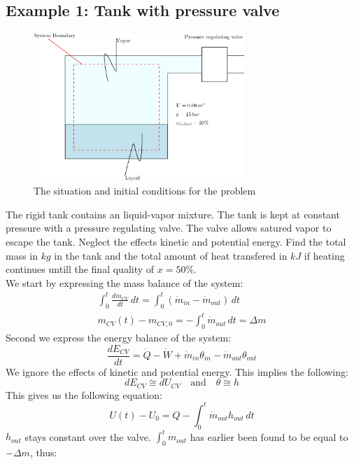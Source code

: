\documentclass[11pt, a4paper]{article}
\begin{document}
\subsection{Example 1: Tank with pressure valve}
\begin{figure}[H]
  \centerline{\includegraphics[width=80mm]{images/Tank.png}}
  \caption{The situation and initial conditions for the problem}
\end{figure}
The rigid tank contains an  liquid-vapor mixture. The tank is kept at constant pressure with a pressure regulating valve. The valve allows satured vapor to escape the tank. Neglect the effects kinetic and potential energy. Find the total mass in $kg$ in the tank and the total amount of heat transfered in $kJ$ if heating continues untill the final quality of $x=50\%$.\\
We start by expressing the mass balance of the system:
\begin{gather*}
  \int_{0}^{t} \frac{dm_{CV}}{dt}\,dt = \int_{0}^{t} (\dot{m}_{in} - \dot{m}_{out})\,dt\\
  m_{CV}(t) - m_{CV,0} = - \int_{0}^{t} \dot{m}_{out} \, dt = \Delta m 
\end{gather*} 
Second we express the energy balance of the system:
\begin{equation*}
  \frac{dE_{CV}}{dt} = \dot{Q} - \dot{W} + \dot{m}_{in}\theta_{in} - \dot{m}_{out}\theta_{out}
\end{equation*}
We ignore the effects of kinetic and potential energy. This implies the following:
\begin{equation*}
  dE_{CV} \cong dU_{CV} \quad \text{and} \quad \theta \cong h
\end{equation*}
This gives us the following equation:
\begin{equation*}
  U(t) - U_0 = Q - \int_{0}^{t} \dot{m}_{out} h_{out}\, dt
\end{equation*}
$h_{out}$ stays constant over the valve. $\int_{0}^{t} \dot{m}_{out}$ has earlier been found to be equal to $-\Delta m$, thus:
\end{document}
